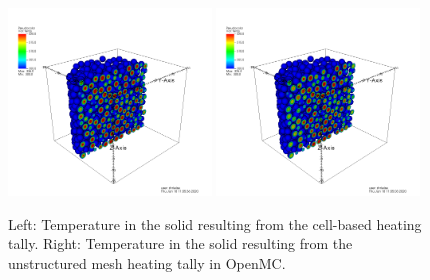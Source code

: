 \begin{figure}[!h]
\centering
\includegraphics[clip=true,width=0.48\textwidth]{Figures/openmc_cell_temperature}
\includegraphics[clip=true,width=0.48\textwidth]{Figures/openmc_mesh_temperature}
\caption{Left: Temperature in the solid resulting from the cell-based heating tally. Right: Temperature in the solid resulting from the unstructured mesh heating tally in OpenMC.}
\label{f:1568_openmc_temperatures}
\end{figure}

